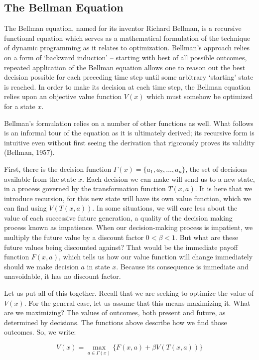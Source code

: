 \documentclass[letter,12pt]{article}
\begin{document}
\subsection{The Bellman Equation}
The Bellman equation, named for its inventor Richard Bellman, is a recursive functional equation which serves as a mathematical formulation of the technique of dynamic programming as it relates to optimization. Bellman’s approach relies on a form of ‘backward induction’ – starting with best of all possible outcomes, repeated application of the Bellman equation allows one to reason out the best decision possible for each preceding time step until some arbitrary ‘starting’ state is reached. In order to make its decision at each time step, the Bellman equation relies upon an objective value function $V(x)$ which must somehow be optimized for a state $x$. 

Bellman’s formulation relies on a number of other functions as well. What follows is an informal tour of the equation as it is ultimately derived; its recursive form is intuitive even without first seeing the derivation that rigorously proves its validity (Bellman, 1957).  

First, there is the decision function $\Gamma(x) = \{a_1,a_2,\ldots,a_n\}$, the set of decisions available from the state $x$. Each decision we can make will send us to a new state, in a process governed by the transformation function $T(x,a)$. It is here that we introduce recursion, for this new state will have its own value function, which we can find using $V(T(x,a))$. In some situations, we will care less about the value of each successive future generation, a quality of the decision making process known as impatience. When our decision-making process is impatient, we multiply the future value by a discount factor $0 < \beta< 1$. But what are these future values being discounted against? That would be the immediate payoff function $F(x,a)$, which tells us how our value function will change immediately should we make decision $a$ in state $x$. Because its consequence is immediate and unavoidable, it has no discount factor.

Let us put all of this together. Recall that we are seeking to optimize the value of $V(x)$. For the general case, let us assume that this means maximizing it. What are we maximizing? The values of outcomes, both present and future, as determined by decisions. The functions above describe how we find those outcomes. So, we write: 

$$V(x) = \max_{a \in \Gamma(x)}\{F(x,a)+\beta V(T(x,a))\}$$
\end{document}
